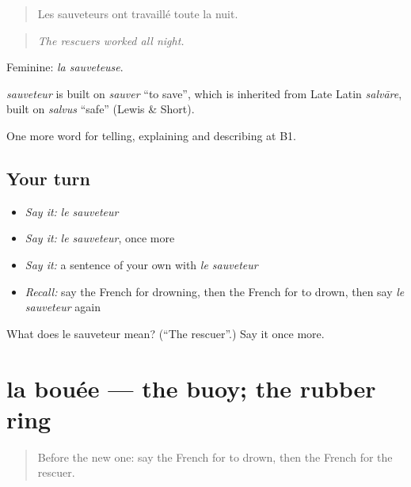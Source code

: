 \begin{quote}
Les sauveteurs ont travaillé toute la nuit.
\end{quote}

\begin{quote}
\emph{The rescuers worked all night.}
\end{quote}

Feminine: \emph{la sauveteuse}.

\begin{cousinweb}
\emph{sauveteur} is built on \emph{sauver} \textquotedblleft{}to save\textquotedblright{}, which is inherited from Late Latin \emph{salvāre}, built on \emph{salvus} \textquotedblleft{}safe\textquotedblright{} (Lewis \& Short).
\end{cousinweb}

\begin{grammarlens}[title={What you've built}]
One more word for telling, explaining and describing at B1.
\end{grammarlens}

\subsection*{Your turn}
\begin{itemize}
\raggedright
  \item \emph{Say it:} \emph{le sauveteur}
  \item \emph{Say it:} \emph{le sauveteur}, once more
  \item \emph{Say it:} a sentence of your own with \emph{le sauveteur}
  \item \emph{Recall:} say the French for drowning, then the French for to drown, then say \emph{le sauveteur} again
\end{itemize}

\begin{tcolorbox}[breakable,colback=teal!4,colframe=teal!35!black,title={Before you move on}]
What does le sauveteur mean? (\textquotedblleft{}The rescuer\textquotedblright{}.) Say it once more.
\end{tcolorbox}
\section[la bouée]{la bouée — the buoy; the rubber ring}

\label{lesson:FR-C304-bouee}



\begin{quote}
Before the new one: say the French for to drown, then the French for the rescuer.
\end{quote}

